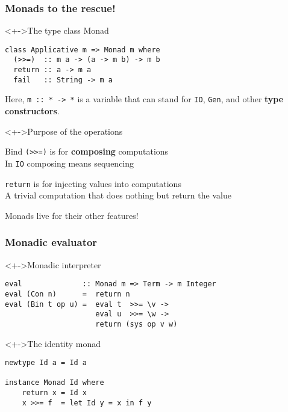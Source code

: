 \documentclass{beamer}
\begin{document}
\begin{frame}[fragile]
  \frametitle{Monads to the rescue!}
\begin{block}<+->{The type class Monad}
\begin{lstlisting}
class Applicative m => Monad m where
  (>>=)  :: m a -> (a -> m b) -> m b
  return :: a -> m a
  fail   :: String -> m a
\end{lstlisting}
  Here, \texttt{m :: * -> *} is a variable that can stand for
  \texttt{IO}, \texttt{Gen}, and other \textbf{type constructors}. 
\end{block}
\begin{block}<+->{Purpose of the operations}
  \begin{alertblock}
  \item Bind \lstinline{(>>=)} is for \textbf{composing}
    computations\\
    In \lstinline{IO} composing means sequencing
  \item \lstinline{return} is for injecting values into computations\\
    A trivial computation that does nothing but return the value
  \item Monads live for their other features!
  \end{alertblock}
\end{block}
\end{frame}     


\begin{frame}[fragile]
  \frametitle{Monadic evaluator}
\begin{exampleblock}<+->{Monadic interpreter}
\begin{lstlisting}
eval              :: Monad m => Term -> m Integer
eval (Con n)      =  return n
eval (Bin t op u) =  eval t  >>= \v ->
                     eval u  >>= \w ->
                     return (sys op v w)
\end{lstlisting}  
\end{exampleblock}
  \begin{alertblock}<+->{The identity monad}
\begin{lstlisting}
newtype Id a = Id a

instance Monad Id where
    return x = Id x
    x >>= f  = let Id y = x in f y
\end{lstlisting}  
\end{alertblock}

\end{frame}             
\end{document}

